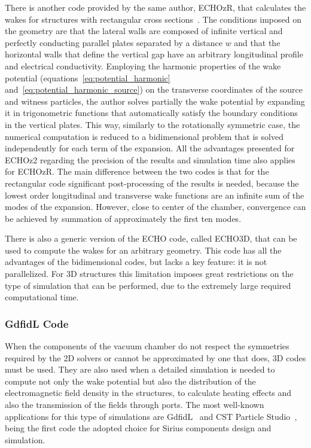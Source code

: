     There is another code provided by the same author, ECHOzR, that calculates the wakes for structures with rectangular cross sections~\cite{Zagorodnov2015}. The conditions imposed on the geometry are that the lateral walls are composed of infinite vertical and perfectly conducting parallel plates separated by a distance $w$ and that the horizontal walls that define the vertical gap have an arbitrary longitudinal profile and electrical conductivity. Employing the harmonic properties of the wake potential (equations~\eqref{eq:potential_harmonic} and~\eqref{eq:potential_harmonic_source}) on the transverse coordinates of the source and witness particles, the author solves partially the wake potential by expanding it in trigonometric functions that automatically satisfy the boundary conditions in the vertical plates. This way, similarly to the rotationally symmetric case, the numerical computation is reduced to a bidimensional problem that is solved independently for each term of the expansion. All the advantages presented for ECHOz2 regarding the precision of the results and simulation time also applies for ECHOzR. The main difference between the two codes is that for the rectangular code significant post-processing of the results is needed, because the lowest order longitudinal and transverse wake functions are an infinite sum of the modes of the expansion. However, close to center of the chamber, convergence can be achieved by summation of approximately the first ten modes.

    There is also a generic version of the ECHO code, called ECHO3D, that can be used to compute the wakes for an arbitrary geometry. This code has all the advantages of the bidimensional codes, but lacks a key feature: it is not parallelized. For 3D structures this limitation imposes great restrictions on the type of simulation that can be performed, due to the extremely large required computational time.

\subsubsection{GdfidL Code}

    When the components of the vacuum chamber do not respect the symmetries required by the 2D solvers or cannot be approximated by one that does, 3D codes must be used. They are also used when a detailed simulation is needed to compute not only the wake potential but also the distribution of the electromagnetic field density in the structures, to calculate heating effects and also the transmission of the fields through ports. The most well-known applications for this type of simulations are GdfidL~\cite{Bruns1997, Bruns2017} and CST Particle Studio~\cite{CST2017}, being the first code the adopted choice for Sirius components design and simulation.


